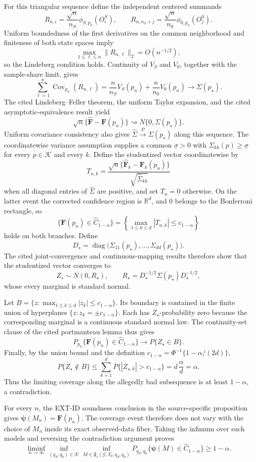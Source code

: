 For this triangular sequence define the independent centered summands
\[
R_{n,i}=\frac{\sqrt n}{n_S}\phi_{S,p_n}(O_i^S),
\qquad
R_{n,n_S+j}=\frac{\sqrt n}{n_0}\phi_{0,p_n}(O_j^0).
\]
Uniform boundedness of the first derivatives on the common neighborhood and finiteness of both state spaces imply
\[
\max_{1\le \ell\le n}\|R_{n,\ell}\|_2=O(n^{-1/2}),
\]
so the Lindeberg condition holds.  Continuity of \(V_S\) and \(V_0\), together with the sample-share limit, gives
\[
\sum_{\ell=1}^{n}\operatorname{Cov}_{p_n}(R_{n,\ell})
=\frac n{n_S}V_S(p_n)+\frac n{n_0}V_0(p_n)
\longrightarrow\Sigma(p_\star).
\]
The cited Lindeberg--Feller theorem, the uniform Taylor expansion, and the cited asymptotic-equivalence result yield
\[
\sqrt n\{\widehat{\mathbf F}-\mathbf F(p_n)\}
\rightsquigarrow N\{0,\Sigma(p_\star)\}.
\]
Uniform covariance consistency also gives \(\widehat\Sigma\xrightarrow{P}\Sigma(p_\star)\) along this sequence.  The coordinatewise variance assumption supplies a common \(\underline\sigma>0\) with \(\Sigma_{kk}(p)\ge\underline\sigma\) for every \(p\in\mathcal K\) and every \(k\).  Define the studentized vector coordinatewise by
\[
T_{n,k}=\frac{\sqrt n\{\widehat{\mathbf F}_k-\mathbf F_k(p_n)\}}{\sqrt{\widehat\Sigma_{kk}}}
\]
when all diagonal entries of \(\widehat\Sigma\) are positive, and set \(T_n=0\) otherwise.  On the latter event the corrected confidence region is \(\mathbb R^d\), and \(0\) belongs to the Bonferroni rectangle, so
\[
\{\mathbf F(p_n)\in\widehat C_{1-\alpha}\}
=\left\{\max_{1\le k\le d}|T_{n,k}|\le c_{1-\alpha}\right\}
\]
holds on both branches.  Define
\[
D_\star=\operatorname{diag}\bigl(\Sigma_{11}(p_\star),\ldots,\Sigma_{dd}(p_\star)\bigr).
\]
The cited joint-convergence and continuous-mapping results therefore show that the studentized vector converges to
\[
Z_\star\sim N(0,R_\star),
\qquad
R_\star=D_\star^{-1/2}\Sigma(p_\star)D_\star^{-1/2},
\]
whose every marginal is standard normal.

Let \(B=\{z:\max_{1\le k\le d}|z_k|\le c_{1-\alpha}\}\).  Its boundary is contained in the finite union of hyperplanes \(\{z:z_k=\pm c_{1-\alpha}\}\).  Each has \(Z_\star\)-probability zero because the corresponding marginal is a continuous standard normal law.  The continuity-set clause of the cited portmanteau lemma thus gives
\[
P_{p_n}\{\mathbf F(p_n)\in\widehat C_{1-\alpha}\}
\longrightarrow P\{Z_\star\in B\}.
\]
Finally, by the union bound and the definition \(c_{1-\alpha}=\Phi^{-1}\{1-\alpha/(2d)\}\),
\[
P\{Z_\star\notin B\}
\le\sum_{k=1}^{d}P\{|Z_{\star,k}|>c_{1-\alpha}\}
=d\,\frac{\alpha}{d}=\alpha.
\]
Thus the limiting coverage along the allegedly bad subsequence is at least \(1-\alpha\), a contradiction.

For every \(n\), the EXT-ID soundness conclusion in the source-specific proposition gives \(\boldsymbol\psi(M_n)=\mathbf F(p_n)\).  The coverage event therefore does not vary with the choice of \(M_n\) inside its exact observed-data fiber.  Taking the infimum over such models and reversing the contradiction argument proves
\[
\liminf_{n\to\infty}\inf_{(q_S,q_0)\in\mathcal K}
\inf_{M\in\mathfrak F_{\epsilon}(\mathcal G,T_0;q_S,q_0)}
P_{q_S,q_0}\{\boldsymbol\psi(M)\in\widehat C_{1-\alpha}\}\ge1-\alpha.
\]